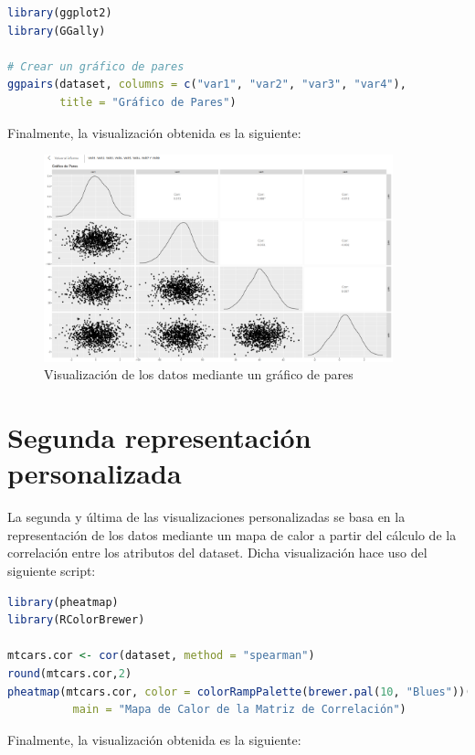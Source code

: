 \documentclass[11pt]{report}
\begin{document}
\begin{lstlisting}[language=R, breaklines=true, basicstyle=\small\ttfamily]
library(ggplot2)
library(GGally)

# Crear un gráfico de pares
ggpairs(dataset, columns = c("var1", "var2", "var3", "var4"), 
        title = "Gráfico de Pares")
\end{lstlisting}

Finalmente, la visualización obtenida es la siguiente:

\begin{figure}[H]
  \centering
  \includegraphics[width=0.9\textwidth]{./img/Pair-Graph-Image.png}
  \caption{Visualización de los datos mediante un gráfico de pares}
  \label{fig:pair}
\end{figure}

\section{Segunda representación personalizada}

La segunda y última de las visualizaciones personalizadas se basa en la representación de los datos mediante un mapa de calor a partir del cálculo de la correlación entre los atributos del dataset. Dicha visualización hace uso del siguiente script:

\begin{lstlisting}[language=R, breaklines=true, basicstyle=\small\ttfamily]
library(pheatmap)
library(RColorBrewer)

mtcars.cor <- cor(dataset, method = "spearman")
round(mtcars.cor,2)
pheatmap(mtcars.cor, color = colorRampPalette(brewer.pal(10, "Blues"))(200), 
          main = "Mapa de Calor de la Matriz de Correlación")
\end{lstlisting}

Finalmente, la visualización obtenida es la siguiente:
\end{document}
